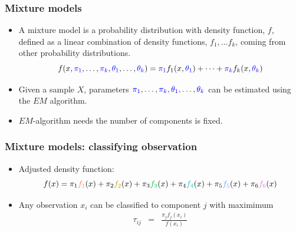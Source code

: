 \begin{frame}

\frametitle{Mixture models}
\begin{itemize}
\item A mixture model is a probability distribution with density function, $f$, defined as a linear combination of density functions, $f_1, \dots f_k$, coming from other probability distributions.
\[
f(x, {\color{blue}\pi_1}, \dots, {\color{blue}\pi_k}, {\color{blue}\theta_1}, \dots, {\color{blue}\theta_k}) = {\color{blue}\pi_1} f_1(x, {\color{blue}\theta_1}) + \dots + {\color{blue}\pi_k} f_k(x, {\color{blue}\theta_k})
\]
\item Given a  sample $X$, parameters ${\color{blue}\pi_1}, \dots, {\color{blue}\pi_k}, {\color{blue}\theta_1}, \dots, {\color{blue}\theta_k}$ can be estimated using the $EM$ algorithm.
\item $EM$-algorithm needs the number of components is fixed.
\end{itemize}
\end{frame}

\begin{frame}
\frametitle{Mixture models: classifying observation}

\begin{itemize}
\item Adjusted density function:
\[
f(x) = \pi_1 \gga{f_1}(x) + \pi_2 \ggb{f_2}(x) + \pi_3 \ggc{f_3}(x) + \pi_4 \ggd{f_4}(x) + \pi_5 \gge{f_5}(x) + \pi_6 \ggf{f_6}(x)
\]
\item Any observation $x_i$ can be classified to component $j$ with maximimum
\begin{eqnarray*} \tau_{ij} &=& \frac{\pi_j f_j(x_i)}{f(x_i) } \end{eqnarray*}
\end{itemize}

\end{frame}

